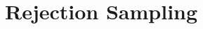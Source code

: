 \documentclass{eecslides}\usepackage[]{graphicx}\usepackage[]{color}
\begin{document}












\section{Rejection Sampling}
\end{document}
